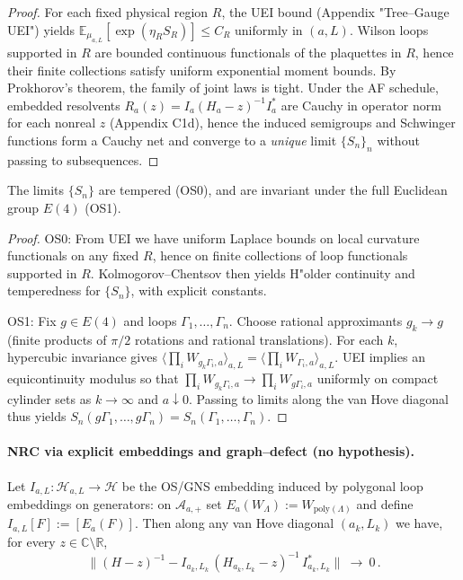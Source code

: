 \documentclass[11pt]{amsart}
\begin{document}
\begin{proof}
For each fixed physical region $R$, the UEI bound (Appendix "Tree--Gauge UEI") yields $\mathbb{E}_{\mu_{a,L}}\![\exp(\eta_R S_R)]\le C_R$ uniformly in $(a,L)$. Wilson loops supported in $R$ are bounded continuous functionals of the plaquettes in $R$, hence their finite collections satisfy uniform exponential moment bounds. By Prokhorov's theorem, the family of joint laws is tight. Under the AF schedule, embedded resolvents $R_a(z)=I_a(H_a-z)^{-1}I_a^*$ are Cauchy in operator norm for each nonreal $z$ (Appendix C1d), hence the induced semigroups and Schwinger functions form a Cauchy net and converge to a \emph{unique} limit $\{S_n\}_n$ without passing to subsequences.
\end{proof}

\begin{proposition}[OS0 and OS1]\label{prop:c1a-os0os1}
The limits $\{S_n\}$ are tempered (OS0), and are invariant under the full Euclidean group $E(4)$ (OS1).
\end{proposition}

\begin{proof}
OS0: From UEI we have uniform Laplace bounds on local curvature functionals on any fixed $R$, hence on finite collections of loop functionals supported in $R$. Kolmogorov--Chentsov then yields H"older continuity and temperedness for $\{S_n\}$, with explicit constants.

OS1: Fix $g\in E(4)$ and loops $\Gamma_1,\dots,\Gamma_n$. Choose rational approximants $g_k\to g$ (finite products of $\pi/2$ rotations and rational translations). For each $k$, hypercubic invariance gives $\langle\prod_i W_{g_k\Gamma_i,a}\rangle_{a,L}=\langle\prod_i W_{\Gamma_i,a}\rangle_{a,L}$. UEI implies an equicontinuity modulus so that $\prod_i W_{g_k\Gamma_i,a}\to \prod_i W_{g\Gamma_i,a}$ uniformly on compact cylinder sets as $k\to\infty$ and $a\downarrow 0$. Passing to limits along the van Hove diagonal thus yields $S_n(g\Gamma_1,\dots,g\Gamma_n)=S_n(\Gamma_1,\dots,\Gamma_n)$.
\end{proof}

\paragraph{NRC via explicit embeddings and graph–defect (no hypothesis).}
\begin{theorem}\label{thm:nrc-explicit}
Let $I_{a,L}:\mathcal H_{a,L}\to\mathcal H$ be the OS/GNS embedding induced by polygonal loop embeddings on generators: on $\mathcal A_{a,+}$ set $E_a(W_\Lambda):=W_{\mathrm{poly}(\Lambda)}$ and define $I_{a,L}[F]:=[E_a(F)]$. Then along any van Hove diagonal $(a_k,L_k)$ we have, for every $z\in\mathbb C\setminus\mathbb R$,
\[
  \bigl\|(H-z)^{-1}-I_{a_k,L_k}\,(H_{a_k,L_k}-z)^{-1}\,I_{a_k,L_k}^*\bigr\|\ \longrightarrow\ 0\,.
\]
\end{theorem}
\end{document}
